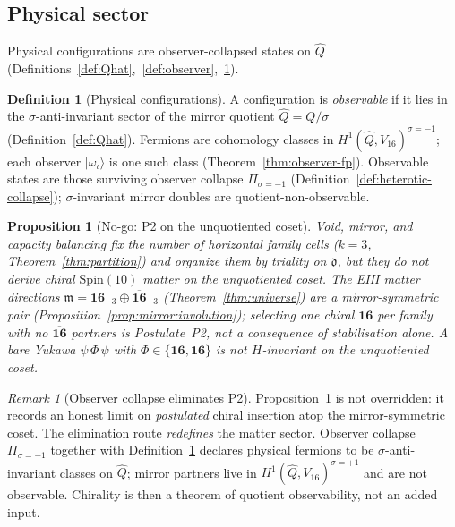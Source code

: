 \documentclass[aps,prd,onecolumn,amsmath,amssymb,nofootinbib,11pt]{revtex4-2}
\numberwithin{equation}{section}
\theoremstyle{plain}
\newtheorem{proposition}[theorem]{Proposition}
\theoremstyle{definition}
\newtheorem{definition}[theorem]{Definition}
\theoremstyle{remark}
\newtheorem{remark}[theorem]{Remark}
\newcommand{\Spin}{\mathrm{Spin}}
\newcommand{\orderparam}{\Phi}
\begin{document}
\subsection{Physical sector}
\label{sec:physics:sector}

Physical configurations are observer-collapsed states on $\hat Q$
(Definitions~\ref{def:Qhat},~\ref{def:observer},~\ref{def:physical}).

\begin{definition}[Physical configurations]\label{def:physical}
A configuration is \emph{observable} if it lies in the $\sigma$-anti-invariant
sector of the mirror quotient $\hat Q=Q/\sigma$
(Definition~\ref{def:Qhat}). Fermions are cohomology classes in
$H^1(\hat Q,V_{16})^{\sigma=-1}$; each observer $|\omega_\iota\rangle$ is one
such class (Theorem~\ref{thm:observer-fp}). Observable states are those
surviving observer collapse $\Pi_{\sigma=-1}$
(Definition~\ref{def:heterotic-collapse}); $\sigma$-invariant mirror doubles
are quotient-non-observable.
\end{definition}

\begin{proposition}[No-go: P2 on the unquotiented coset]\label{prop:p2-nogo}
Void, mirror, and capacity balancing fix the \emph{number} of horizontal
family cells ($k=3$, Theorem~\ref{thm:partition}) and organize them by triality
on $\mathfrak{d}$, but they do \emph{not} derive chiral $\Spin(10)$ matter on
the unquotiented coset. The EIII matter directions
$\mathfrak{m}=\mathbf{16}_{-3}\oplus\overline{\mathbf{16}}_{+3}$
(Theorem~\ref{thm:universe}) are a mirror-symmetric pair
(Proposition~\ref{prop:mirror:involution}); selecting one chiral
$\mathbf{16}$ per family with no $\overline{\mathbf{16}}$ partners is
\emph{Postulate~P2}, not a consequence of stabilisation alone. A bare Yukawa
$\bar\psi\,\orderparam\,\psi$ with
$\orderparam\in\{\mathbf{16},\overline{\mathbf{16}}\}$ is not $H$-invariant on
the unquotiented coset.
\end{proposition}

\begin{remark}[Observer collapse eliminates P2]
Proposition~\ref{prop:p2-nogo} is not overridden: it records an honest limit
on \emph{postulated} chiral insertion atop the mirror-symmetric coset. The
elimination route \emph{redefines} the matter sector. Observer collapse
$\Pi_{\sigma=-1}$ together with Definition~\ref{def:physical} declares
physical fermions to be $\sigma$-anti-invariant classes on $\hat Q$; mirror
partners live in $H^1(\hat Q,V_{16})^{\sigma=+1}$ and are not observable.
Chirality is then a theorem of quotient observability, not an added input.
\end{remark}
\end{document}
